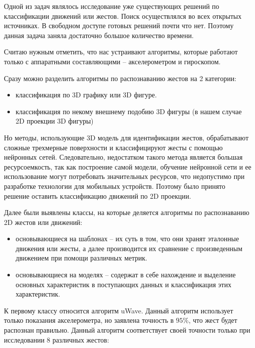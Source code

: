 Одной из задач являлось исследование уже существующих решений по классификации движений или жестов. Поиск осуществлялся во всех открытых источниках. В свободном доступе готовых решений почти что нет. Поэтому данная задача заняла достаточно большое количество времени.

Считаю нужным отметить, что нас устраивают алгоритмы, которые работают только с аппаратными составляющими – акселерометром и гироскопом.

Сразу можно разделить алгоритмы по распознаванию жестов на 2 категории:

\begin{itemize}
    \item классификация по 3D графику или 3D фигуре.
    \item классификация по некому внешнему подобию 3D фигуры (в нашем случае 2D проекции 3D фигуры)
\end{itemize}

Но методы, использующие 3D модель для идентификации жестов, обрабатывают сложные трехмерные поверхности и классифицируют жесты с помощью нейронных сетей. Следовательно, недостатком такого метода является большая ресурсоемкость, так как построение самой модели, обучение нейронной сети и ее использование могут потребовать значительных ресурсов, что недопустимо при разработке технологии для мобильных устройств. Поэтому было принято решение оставить классификацию движений по 2D проекции.

Далее были выявлены классы, на которые деляется алгоритмы по распознаванию 2D жестов или движений:

\begin{itemize}
    \item основывающиеся на шаблонах – их суть в том, что они хранят эталонные движения или жесты, а далее производится их сравнение с произведенным движением при помощи различных метрик.
    \item основывающиеся на моделях -- содержат в себе нахождение и выделение основных характеристик в поступающих данных и классификация этих характеристик.
\end{itemize}

К первому классу относится алгоритм uWave. Данный алгоритм использует только показания акселерометра, но  заявлена точность в $95 \%$, что жест будет распознан правильно.
Данный алгоритм соответствует своей точности только при исследовании 8 различных жестов:

